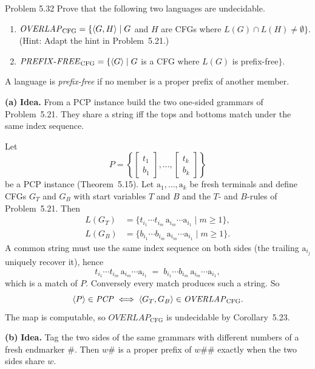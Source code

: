 \begin{question}{Problem 5.32}
Prove that the following two languages are undecidable.
\begin{enumerate}[label=\alph*.]
\item $\mathit{OVERLAP}_{\mathrm{CFG}}=\{\langle G,H\rangle\mid G$ and $H$ are CFGs where $L(G)\cap L(H)\neq\emptyset\}$.
(Hint: Adapt the hint in Problem~5.21.)
\item $\mathit{PREFIX\text{-}FREE}_{\mathrm{CFG}}=\{\langle G\rangle\mid G$ is a CFG where $L(G)$ is prefix-free$\}$.
\end{enumerate}
\end{question}
\begin{soln}
A language is \emph{prefix-free} if no member is a proper prefix of another member.

\textbf{(a)}
\textbf{Idea.} From a PCP instance build the two one-sided grammars of Problem~5.21. They share a string iff the tops and bottoms match under the same index sequence.

Let
\[
P=\left\{\begin{bmatrix}t_1\\ b_1\end{bmatrix},\ldots,
\begin{bmatrix}t_k\\ b_k\end{bmatrix}\right\}
\]
be a PCP instance (Theorem~5.15). Let $\mathrm{a}_1,\ldots,\mathrm{a}_k$ be fresh terminals and define CFGs $G_T$ and $G_B$ with start variables $T$ and $B$ and the $T$- and $B$-rules of Problem~5.21. Then
\begin{align*}
L(G_T)&=\{t_{i_1}\cdots t_{i_m}\,\mathrm{a}_{i_m}\cdots\mathrm{a}_{i_1}\mid m\ge 1\},\\
L(G_B)&=\{b_{i_1}\cdots b_{i_m}\,\mathrm{a}_{i_m}\cdots\mathrm{a}_{i_1}\mid m\ge 1\}.
\end{align*}
A common string must use the same index sequence on both sides (the trailing $\mathrm{a}_{i_j}$ uniquely recover it), hence
\[
t_{i_1}\cdots t_{i_m}\,\mathrm{a}_{i_m}\cdots\mathrm{a}_{i_1}
\;=\;
b_{i_1}\cdots b_{i_m}\,\mathrm{a}_{i_m}\cdots\mathrm{a}_{i_1},
\]
which is a match of $P$. Conversely every match produces such a string. So
\[
\langle P\rangle\in\mathit{PCP} \iff \langle G_T,G_B\rangle\in\mathit{OVERLAP}_{\mathrm{CFG}}.
\]
The map is computable, so $\mathit{OVERLAP}_{\mathrm{CFG}}$ is undecidable by Corollary~5.23.

\textbf{(b)}
\textbf{Idea.} Tag the two sides of the same grammars with different numbers of a fresh endmarker $\#$. Then $w\#$ is a proper prefix of $w\#\#$ exactly when the two sides share $w$.


\end{soln}
